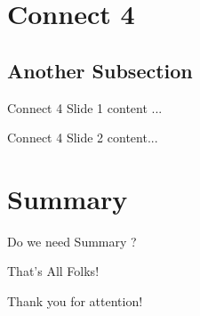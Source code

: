 \documentclass[aspectratio=169]{beamer}
\begin{document}
\section{Connect 4}

\subsection{Another Subsection}

\begin{frame}{Connect 4 Slide 1}
	content ...
\end{frame}

\begin{frame}{Connect 4 Slide 2}
	content...
\end{frame}



\section*{Summary}

\begin{frame}{Do we need Summary ?}
	
\end{frame}

\begin{frame}{That's All Folks!}
	\begin{center}
     {\huge	Thank you for attention! }
	\end{center}
	
\end{frame}
\end{document}
